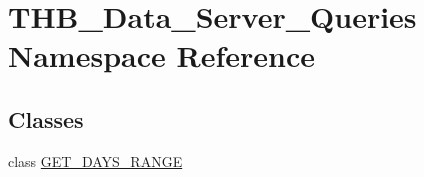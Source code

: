 \hypertarget{namespace_t_h_b___data___server___queries}{}\section{T\+H\+B\+\_\+\+Data\+\_\+\+Server\+\_\+\+Queries Namespace Reference}
\label{namespace_t_h_b___data___server___queries}
\subsection*{Classes}
\begin{DoxyCompactItemize}
\item 
class \mbox{\hyperlink{class_t_h_b___data___server___queries_1_1_g_e_t___d_a_y_s___r_a_n_g_e}{G\+E\+T\+\_\+\+D\+A\+Y\+S\+\_\+\+R\+A\+N\+GE}}
\end{DoxyCompactItemize}
